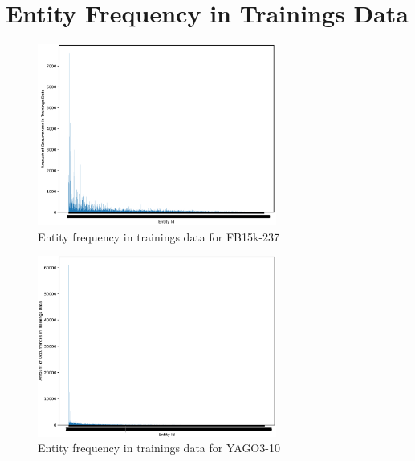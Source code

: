 \section{Entity Frequency in Trainings Data}
\label{appendix:entity_freq}

\begin{figure}[H]
\centering
\includegraphics[width=0.7\textwidth]{images/entity_freq_fb15k.PNG}
\caption{Entity frequency in trainings data for FB15k-237}
\label{fig:entity_freq_fb15k}
\end{figure}

\begin{figure}[H]
\centering
\includegraphics[width=0.7\textwidth]{images/entity_freq_yago.PNG}
\caption{Entity frequency in trainings data for YAGO3-10}
\label{fig:entity_freq_yago}
\end{figure}
